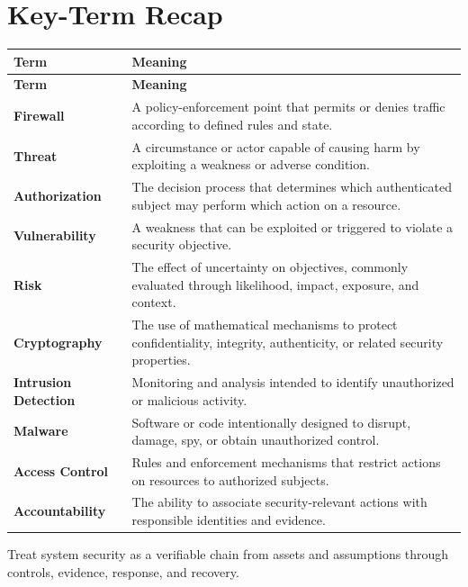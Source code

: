 \documentclass[11pt]{article}
\begin{document}
\section*{Key-Term Recap}
\begin{longtable}{>{\RaggedRight\arraybackslash}p{}>{\RaggedRight\arraybackslash}p{}}
\toprule\rowcolor{Navy}\color{white}\textbf{Term} & \color{white}\textbf{Meaning}\\\midrule
\endfirsthead
\toprule\rowcolor{Navy}\color{white}\textbf{Term} & \color{white}\textbf{Meaning}\\\midrule
\endhead
\textbf{Firewall} & A policy-enforcement point that permits or denies traffic according to defined rules and state. \\\midrule
\textbf{Threat} & A circumstance or actor capable of causing harm by exploiting a weakness or adverse condition. \\\midrule
\textbf{Authorization} & The decision process that determines which authenticated subject may perform which action on a resource. \\\midrule
\textbf{Vulnerability} & A weakness that can be exploited or triggered to violate a security objective. \\\midrule
\textbf{Risk} & The effect of uncertainty on objectives, commonly evaluated through likelihood, impact, exposure, and context. \\\midrule
\textbf{Cryptography} & The use of mathematical mechanisms to protect confidentiality, integrity, authenticity, or related security properties. \\\midrule
\textbf{Intrusion Detection} & Monitoring and analysis intended to identify unauthorized or malicious activity. \\\midrule
\textbf{Malware} & Software or code intentionally designed to disrupt, damage, spy, or obtain unauthorized control. \\\midrule
\textbf{Access Control} & Rules and enforcement mechanisms that restrict actions on resources to authorized subjects. \\\midrule
\textbf{Accountability} & The ability to associate security-relevant actions with responsible identities and evidence. \\\midrule
\bottomrule
\end{longtable}
\begin{takeawaybox}
Treat system security as a verifiable chain from assets and assumptions through controls, evidence, response, and recovery.
\end{takeawaybox}
\end{document}
